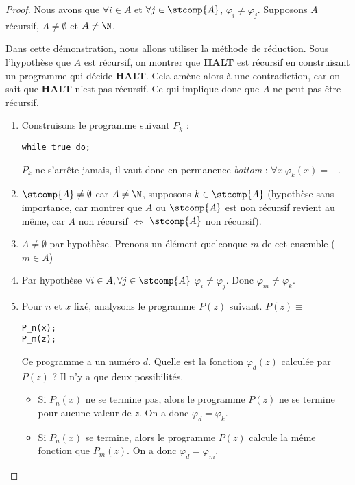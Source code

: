 \begin{proof}
Nous avons que $\forall i \in A$ et $\forall j \in \stcomp{A}$, $\varphi_i \neq
\varphi_j$. Supposons $A$ récursif, $A \neq \emptyset$ et $A\neq \N$.

Dans cette démonstration, nous allons utiliser la méthode de réduction.
Sous l'hypothèse que $A$ est récursif, on montrer que \textbf{HALT} est récursif en construisant un programme qui décide \textbf{HALT}.  Cela amène alors à une contradiction, car on sait que \textbf{HALT} n'est pas récursif.  Ce qui implique donc que $A$ ne peut pas être récursif.

\begin{enumerate}
	\item Construisons le programme suivant $P_k$ :
		\begin{lstlisting}
while true do;
		\end{lstlisting}
			$P_k$ ne s'arrête jamais, il vaut donc en permanence \textit{bottom} : $\forall x \ \varphi_k(x) = \bot$.
			
	\item $\stcomp{A}\neq \emptyset$ car $A \neq \N$,
	supposons $k\in \stcomp{A}$ (hypothèse sans importance, car montrer que
	$A$ ou $\stcomp{A}$ est non récursif revient au même, car $A$ non
	récursif $ \Leftrightarrow $ $\stcomp{A}$ non récursif).
	\item $A\neq \emptyset$ par hypothèse.  Prenons un élément quelconque $m$ de cet ensemble  ($m\in A$)
	\item Par hypothèse  $\forall i \in A, \forall j \in \stcomp{A}$ $\varphi_i\neq \varphi_j$.  Donc 
		$\varphi_m \neq \varphi_k$.
	\item Pour $n$ et $x$ fixé, analysons le programme $P(z)$ suivant. 
		$P(z) \equiv $
		\begin{lstlisting}
P_n(x);
P_m(z);
		\end{lstlisting}

			Ce programme a un numéro $d$.  Quelle est la fonction $\varphi_d(z)$ calculée par $P(z)$ ? Il n'y a que deux possibilités.
			\begin{itemize}
				\item Si $P_n(x)$ ne se termine pas, alors le programme $P(z)$ ne se termine pour aucune valeur de $z$. On a donc $\varphi_d =\varphi_k$. 
				\item Si $P_n(x)$ se termine, alors le programme $P(z)$ calcule la même fonction que $P_m(z)$. On a donc $\varphi_d =\varphi_m$. 
			\end{itemize}


\end{enumerate}
\end{proof}
